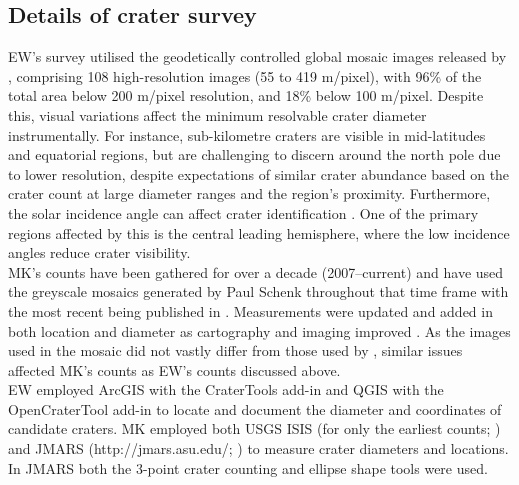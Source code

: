 \documentclass[preprint,12pt,3p,times,authoryear]{elsarticle}
\begin{document}

\subsection{Details of crater survey}
\label{app:survey}
EW’s survey utilised the geodetically controlled global mosaic images released by \citet{Bland2018}, comprising 108 high-resolution images (55 to 419 m/pixel), with 96\% of the total area below 200 m/pixel resolution, and 18\% below 100 m/pixel. Despite this, visual variations affect the minimum resolvable crater diameter instrumentally. For instance, sub-kilometre craters are visible in mid-latitudes and equatorial regions, but are challenging to discern around the north pole due to lower resolution, despite expectations of similar crater abundance based on the crater count at large diameter ranges and the region’s proximity. Furthermore, the solar incidence angle can affect crater identification \citep{Ostrach2011}. One of the primary regions affected by this is the central leading hemisphere, where the low incidence angles reduce crater visibility.\\

MK's counts have been gathered for over a decade (2007–current) and have used the greyscale mosaics generated by Paul Schenk throughout that time frame \citep{Schenk2011,Schenk2018} with the most recent being published in \citet{Schenk2024}. Measurements were updated and added in both location and diameter as cartography and imaging improved \citet{Kirchoff2016,Kirchoff2018}. As the images used in the mosaic did not vastly differ from those used by \citet{Bland2018}, similar issues affected MK's counts as EW's counts discussed above.\\

EW employed ArcGIS with the CraterTools add-in \citep{Kneissl2011} and QGIS with the OpenCraterTool add-in \citep{Heyer2023} to locate and document the diameter and coordinates of candidate craters. MK employed both USGS ISIS (for only the earliest counts; \citealt{Kirchoff2009}) and JMARS (http://jmars.asu.edu/; \citealt{Christensen2009}) to measure crater diameters and locations.  In JMARS both the 3-point crater counting and ellipse shape tools were used.
\end{document}
